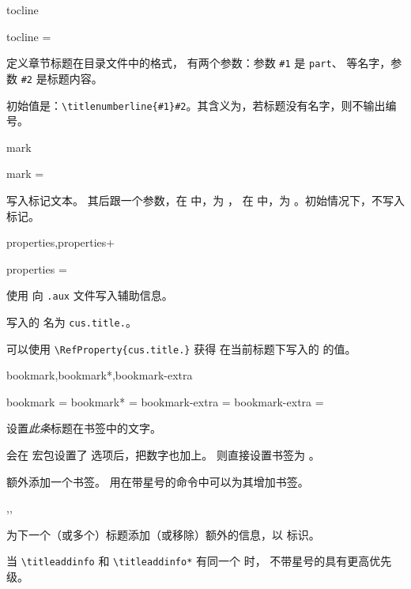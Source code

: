 \documentclass{cusdoc}
\begin{document}
\begin{keyval}[path=title/...]{tocline}
  \begin{syntax}
    tocline = 
  \end{syntax}
定义章节标题在目录文件中的格式， 有两个参数：参数
\verb|#1| 是 \texttt{part}、 等名字，参数 \verb|#2| 是标题内容。

初始值是：\verb|\titlenumberline{#1}#2|。其含义为，若标题没有名字，则不输出编号。
\end{keyval}

\begin{keyval}[path=title/...]{mark}
  \begin{syntax}
    mark = 
  \end{syntax}
写入标记文本。 其后跟一个参数，在  中，为 ，
在  中，为 。初始情况下，不写入标记。
\end{keyval}

\begin{keyval}[path=title/...]{properties,properties+}
  \begin{syntax}
    properties = 
  \end{syntax}
使用  向 \texttt{.aux} 文件写入辅助信息。

写入的  名为 \texttt{cus.title.}。

可以使用 \verb|\RefProperty{cus.title.|\verb|}| 获得
在当前标题下写入的  的值。
\end{keyval}

\begin{keyval}[path=title/...]{bookmark,bookmark*,bookmark-extra}
  \begin{syntax}
    bookmark  = 
    bookmark* = 
    bookmark-extra = 
    bookmark-extra =  
  \end{syntax}
设置\emph{此条}标题在书签中的文字。

 会在  宏包设置了  选项后，把数字也加上。
\linebreak{} 则直接设置书签为 。

 额外添加一个书签。
用在带星号的命令中可以为其增加书签。
\end{keyval}

\begin{function}{\titleaddinfo,\titleremoveinfo,\titleremoveallinfo}
  \begin{syntax}
    \V\titleaddinfo   {} 
    \V\titleaddinfo *  
    \V\titleremoveinfo  {} 
    \V\titleremoveinfo *  
    \V\titleremoveallinfo 
    \V\titleremoveallinfo *
  \end{syntax}
为下一个（或多个）标题添加（或移除）额外的信息，以  标识。

当 \verb|\titleaddinfo| 和 \verb|\titleaddinfo*| 有同一个  时，
不带星号的具有更高优先级。
\end{function}
\end{document}
